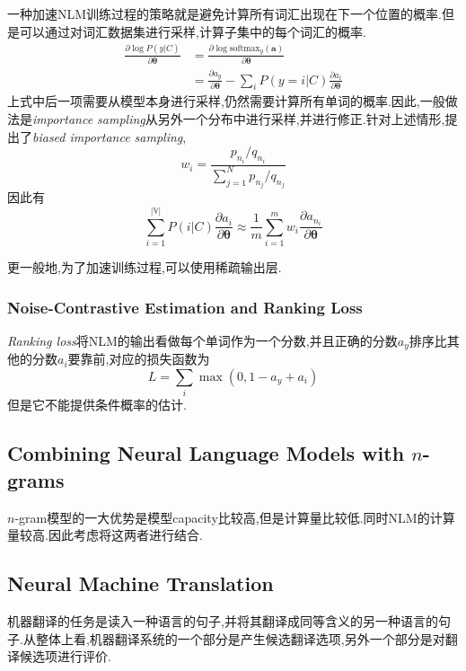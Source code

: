 一种加速NLM训练过程的策略就是避免计算所有词汇出现在下一个位置的概率.但是可以通过对词汇数据集进行采样,计算子集中的每个词汇的概率.
\begin{equation}\begin{split}
\frac{\partial\log P(y|C)}{\partial\bm\theta}&=\frac{\partial\log\text{softmax}_y(\bm a)}{\partial\bm\theta}\\
&=\frac{\partial a_y}{\partial\bm\theta}-\sum_{i}P(y=i|C)\frac{\partial a_i}{\partial\bm\theta}
\end{split}\end{equation}
上式中后一项需要从模型本身进行采样,仍然需要计算所有单词的概率.因此,一般做法是\textit{importance sampling}从另外一个分布中进行采样,并进行修正.针对上述情形,提出了\textit{biased importance sampling},
\begin{equation}
w_i=\frac{p_{n_i}/q_{n_i}}{\sum_{j=1}^Np_{n_j}/q_{n_j}}
\end{equation}
因此有
\begin{equation}
\sum_{i=1}^{|\mathbb V|}P(i|C)\frac{\partial a_i}{\partial\bm\theta}\approx\frac{1}{m}\sum_{i=1}^mw_i\frac{\partial a_{n_i}}{\partial\bm\theta}
\end{equation}

更一般地,为了加速训练过程,可以使用稀疏输出层.

\subsubsection{Noise-Contrastive Estimation and Ranking Loss}

\textit{Ranking loss}将NLM的输出看做每个单词作为一个分数,并且正确的分数$a_y$排序比其他的分数$a_i$要靠前,对应的损失函数为
\begin{equation}
L=\sum_i\max(0,1-a_y+a_i)
\end{equation}
但是它不能提供条件概率的估计.

\subsection{Combining Neural Language Models with $n$-grams}

$n$-gram模型的一大优势是模型capacity比较高,但是计算量比较低.同时NLM的计算量较高.因此考虑将这两者进行结合.

\subsection{Neural Machine Translation}

机器翻译的任务是读入一种语言的句子,并将其翻译成同等含义的另一种语言的句子.从整体上看,机器翻译系统的一个部分是产生候选翻译选项,另外一个部分是对翻译候选项进行评价.

